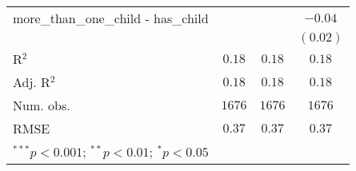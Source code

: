 \begin{table}
\begin{center}
\begin{tabular}{l c c c}
more\_than\_one\_child - has\_child     &               &               & $-0.04$       \\
                                        &               &               & $(0.02)$      \\
\hline
R$^2$                                   & $0.18$        & $0.18$        & $0.18$        \\
Adj. R$^2$                              & $0.18$        & $0.18$        & $0.18$        \\
Num. obs.                               & $1676$        & $1676$        & $1676$        \\
RMSE                                    & $0.37$        & $0.37$        & $0.37$        \\
\hline
\multicolumn{4}{l}{\scriptsize{$^{***}p<0.001$; $^{**}p<0.01$; $^{*}p<0.05$}}
\end{tabular}
\label{table:coefficients}
\end{center}
\end{table}
